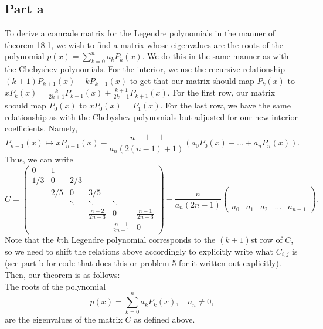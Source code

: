 \documentclass{article}
\begin{document}
\subsection{Part a}
To derive a comrade matrix for the Legendre polynomials in the manner of theorem 18.1, we wish to find a matrix whose eigenvalues are the roots of the polynomial $p(x)=\sum_{k=0}^na_kP_k(x)$. We do this in the same manner as with the Chebyshev polynomials. For the interior, we use the recursive relationship $(k+1)P_{k+1}(x)-kP_{k-1}(x)$ to get that our matrix should map $P_k(x)$ to $xP_k(x)=\frac{k}{2k+1}P_{k-1}(x)+\frac{k+1}{2k+1}P_{k+1}(x)$. For the first row, our matrix should map $P_0(x)$ to $xP_0(x)=P_1(x)$. For the last row, we have the same relationship as with the Chebyshev polynomials but adjusted for our new interior coefficients. Namely,
\[
P_{n-1}(x)\mapsto xP_{n-1}(x)-\frac{n-1+1}{a_n(2(n-1)+1)}(a_0P_0(x)+\ldots+a_nP_n(x)).
\]
Thus, we can write
\[ 
C =
\begin{pmatrix}
0 & 1   \\
1/3 & 0 & 2/3 \\
 & 2/5 & 0 & 3/5 \\
  & & \ddots & \ddots & \ddots \\
  & & & \frac{n-2}{2n-3} & 0 & \frac{n-1}{2n-3} \\
  & & & & \frac{n-1}{2n-1} & 0
\end{pmatrix}
-\frac{n}{a_n(2n-1)}
\begin{pmatrix}
\\
\\
\\
\\
\\
a_0 & a_1 & a_2 & \dots & a_{n-1}
\end{pmatrix}.
\]
Note that the $k$th Legendre polynomial corresponds to the $(k+1)$st row of $C$, so we need to shift the relations above accordingly to explicitly write what $C_{i,j}$ is (see part b for code that does this or problem 5 for it written out explicitly). \\
Then, our theorem is as follows: \\
The roots of the polynomial 
\[
p(x)=\sum_{k=0}^na_kP_k(x), \quad a_n\neq0,
\]
are the eigenvalues of the matrix $C$ as defined above.
\end{document}
